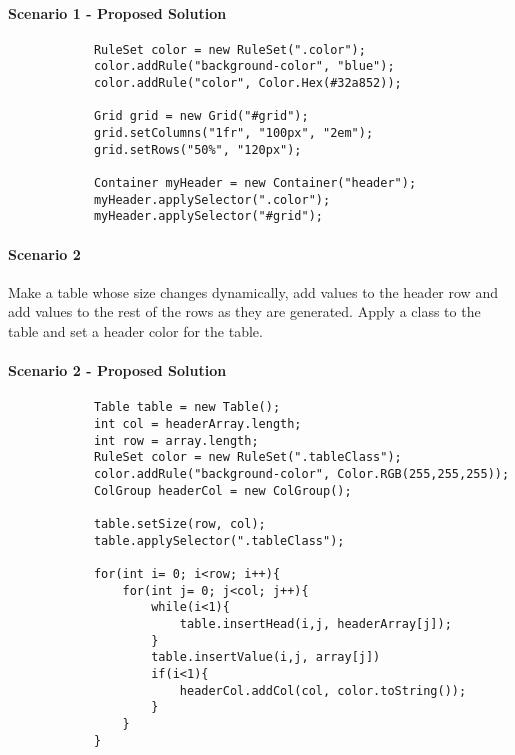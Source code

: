 \documentclass[12pt]{article}
\begin{document}
        \paragraph{Scenario 1 - Proposed Solution}

        \begin{lstlisting}
            RuleSet color = new RuleSet(".color");
            color.addRule("background-color", "blue");
            color.addRule("color", Color.Hex(#32a852));

            Grid grid = new Grid("#grid");
            grid.setColumns("1fr", "100px", "2em");
            grid.setRows("50%", "120px");

            Container myHeader = new Container("header");
            myHeader.applySelector(".color");
            myHeader.applySelector("#grid");
        \end{lstlisting}


        \paragraph{Scenario 2}
        Make a table whose size changes dynamically, add values to the header row and add values to the rest of the rows as they are generated. Apply a class to the table and set a header color for the table.


        \paragraph{Scenario 2 - Proposed Solution}

        \begin{lstlisting}
            Table table = new Table();
            int col = headerArray.length;
            int row = array.length;
            RuleSet color = new RuleSet(".tableClass");
            color.addRule("background-color", Color.RGB(255,255,255));
            ColGroup headerCol = new ColGroup();

            table.setSize(row, col);
            table.applySelector(".tableClass");

            for(int i= 0; i<row; i++){
                for(int j= 0; j<col; j++){
                    while(i<1){
                        table.insertHead(i,j, headerArray[j]);
                    }
                    table.insertValue(i,j, array[j])
                    if(i<1){
                        headerCol.addCol(col, color.toString());
                    }
                }
            }
        \end{lstlisting}
\end{document}
